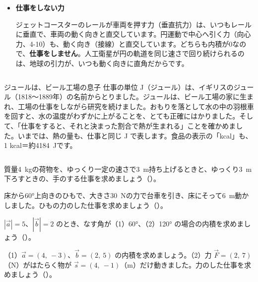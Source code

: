 \begin{butsuri}
\begin{itemize}[leftmargin=1.2\zw, itemsep=2pt, topsep=0pt, label={\color{bkPurple}●}]
野球のスピードガンは、はね返ってくる電波の振動数の変化から速さをはかります。はかれるのは、ボールの速度の「ガンの向きの成分」、つまり速度とガンの向きの単位ベクトルとの内積だけです。\qty{40}{m/s}の球を、ボールの進む向きから30°ずれた所ではかると、$40\cos30°\approx\qty{34.6}{m/s}$ と小さく出てしまいます。救急車のサイレンの音の高さが変わる（ドップラー効果）のも、救急車の速度の「自分に向かう成分」によって決まります。
\item \textbf{仕事をしない力}\par
ジェットコースターのレールが車両を押す力（垂直抗力）は、いつもレールに垂直で、車両の動く向きと直交しています。円運動で中心へ引く力（向心力、4-10）も、動く向き（接線）と直交しています。どちらも内積が0なので、\textbf{仕事をしません}。人工衛星が円の軌道を同じ速さで回り続けられるのは、地球の引力が、いつも動く向きに直角だからです。
\end{itemize}
\end{butsuri}

\begin{column}{ジュールは、ビール工場の息子}
仕事の単位 J（ジュール）は、イギリスのジュール（1818〜1889年）の名前からとりました。ジュールは、ビール工場の家に生まれ、工場の仕事をしながら研究を続けました。おもりを落として水の中の羽根車を回すと、水の温度がわずかに上がることを、とても正確にはかりました。そして、「仕事をすると、それと決まった割合で熱が生まれる」ことを確かめました。いまでは、熱の量も、仕事と同じ J で表します。食品の表示の「kcal」も、1 kcal＝約\qty{4184}{J}です。
\end{column}

\bkendproblems
{}

\bkproblem 質量\qty{4}{kg}の荷物を、ゆっくり一定の速さで\qty{3}{m}持ち上げるときと、ゆっくり\qty{3}{m}下ろすときの、手のする仕事を求めましょう（）。

\bkproblem 床から60°上向きのひもで、大きさ\qty{30}{N}の力で台車を引き、床にそって\qty{6}{m}動かしました。ひもの力のした仕事を求めましょう（）。

\bkproblem $|\vec{a}|=5$、$|\vec{b}|=2$ のとき、なす角が（1）60°、（2）120° の場合の内積を求めましょう（）。

\bkproblem （1）$\vec{a}=(4,\ -3)$、$\vec{b}=(2,\ 5)$ の内積を求めましょう。（2）力 $\vec{F}=(2,\ 7)$（N）がはたらく物が $\vec{s}=(4,\ -1)$（m）だけ動きました。力のした仕事を求めましょう（）。

